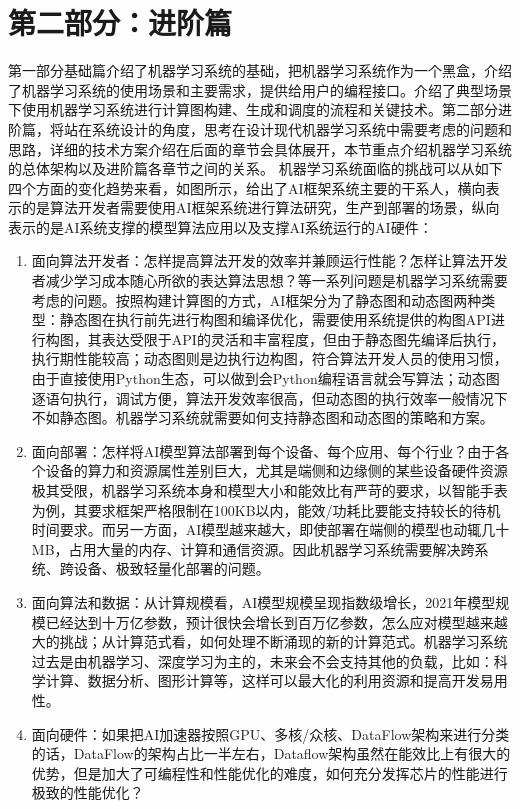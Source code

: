 \documentclass[letterpaper,10pt,english]{sphinxmanual}
\begin{document}
\chapter{第二部分：进阶篇}
\label{\detokenize{chapter_preface_advanced/index:id1}}\label{\detokenize{chapter_preface_advanced/index::doc}}
\sphinxAtStartPar
第一部分基础篇介绍了机器学习系统的基础，把机器学习系统作为一个黑盒，介绍了机器学习系统的使用场景和主要需求，提供给用户的编程接口。介绍了典型场景下使用机器学习系统进行计算图构建、生成和调度的流程和关键技术。第二部分进阶篇，将站在系统设计的角度，思考在设计现代机器学习系统中需要考虑的问题和思路，详细的技术方案介绍在后面的章节会具体展开，本节重点介绍机器学习系统的总体架构以及进阶篇各章节之间的关系。
机器学习系统面临的挑战可以从如下四个方面的变化趋势来看，如图所示，给出了AI框架系统主要的干系人，横向表示的是算法开发者需要使用AI框架系统进行算法研究，生产到部署的场景，纵向表示的是AI系统支撑的模型算法应用以及支撑AI系统运行的AI硬件：
\begin{enumerate}
%
\item {} 
\sphinxAtStartPar
面向算法开发者：怎样提高算法开发的效率并兼顾运行性能？怎样让算法开发者减少学习成本随心所欲的表达算法思想？等一系列问题是机器学习系统需要考虑的问题。按照构建计算图的方式，AI框架分为了静态图和动态图两种类型：静态图在执行前先进行构图和编译优化，需要使用系统提供的构图API进行构图，其表达受限于API的灵活和丰富程度，但由于静态图先编译后执行，执行期性能较高；动态图则是边执行边构图，符合算法开发人员的使用习惯，由于直接使用Python生态，可以做到会Python编程语言就会写算法；动态图逐语句执行，调试方便，算法开发效率很高，但动态图的执行效率一般情况下不如静态图。机器学习系统就需要如何支持静态图和动态图的策略和方案。

\item {} 
\sphinxAtStartPar
面向部署：怎样将AI模型算法部署到每个设备、每个应用、每个行业？由于各个设备的算力和资源属性差别巨大，尤其是端侧和边缘侧的某些设备硬件资源极其受限，机器学习系统本身和模型大小和能效比有严苛的要求，以智能手表为例，其要求框架严格限制在100KB以内，能效/功耗比要能支持较长的待机时间要求。而另一方面，AI模型越来越大，即使部署在端侧的模型也动辄几十MB，占用大量的内存、计算和通信资源。因此机器学习系统需要解决跨系统、跨设备、极致轻量化部署的问题。

\item {} 
\sphinxAtStartPar
面向算法和数据：从计算规模看，AI模型规模呈现指数级增长，2021年模型规模已经达到十万亿参数，预计很快会增长到百万亿参数，怎么应对模型越来越大的挑战；从计算范式看，如何处理不断涌现的新的计算范式。机器学习系统过去是由机器学习、深度学习为主的，未来会不会支持其他的负载，比如：科学计算、数据分析、图形计算等，这样可以最大化的利用资源和提高开发易用性。

\item {} 
\sphinxAtStartPar
面向硬件：如果把AI加速器按照GPU、多核/众核、DataFlow架构来进行分类的话，DataFlow的架构占比一半左右，Dataflow架构虽然在能效比上有很大的优势，但是加大了可编程性和性能优化的难度，如何充分发挥芯片的性能进行极致的性能优化？

\end{enumerate}
\end{document}
